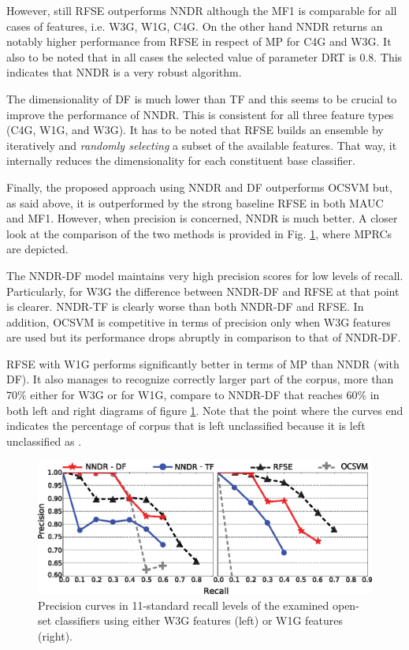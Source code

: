However, still RFSE outperforms NNDR although the MF1 is comparable for all cases of features, i.e. W3G, W1G, C4G. On the other hand NNDR returns an notably higher performance from RFSE in respect of MP for C4G and W3G. It also to be noted that in all cases the selected value of parameter DRT is 0.8. This indicates that NNDR is a very robust algorithm.

The dimensionality of DF is much lower than TF and this seems to be crucial to improve the performance of NNDR. This is consistent for all three feature types (C4G, W1G, and W3G). It has to be noted that RFSE builds an ensemble by iteratively and \textit{randomly selecting} a subset of the available features. That way, it internally reduces the dimensionality for each constituent base classifier. 

Finally, the proposed approach using NNDR and DF outperforms OCSVM but, as said above, it is outperformed by the strong baseline RFSE in both MAUC and MF1. However, when precision is concerned, NNDR is much better. A closer look at  the comparison of the two methods is provided in Fig. \ref{chap:word_embeddings:fig:NNDR_W3G_Best_RFSE_Baseline}, where MPRCs are depicted. 

The NNDR-DF model maintains very high precision scores for low levels of recall. Particularly, for W3G the difference between NNDR-DF and RFSE at that point is clearer. NNDR-TF is clearly worse than both NNDR-DF and RFSE. In addition, OCSVM is competitive in terms of precision only when W3G features are used but its performance drops abruptly in comparison to that of NNDR-DF. 

RFSE with W1G performs significantly better in terms of MP than NNDR (with DF). It also manages to recognize correctly larger part of the corpus, more than $70\%$ either for W3G or for W1G, compare to NNDR-DF that reaches $60\%$ in both left and right diagrams of figure \ref{chap:word_embeddings:fig:NNDR_W3G_Best_RFSE_Baseline}. Note that the point where the curves end indicates the percentage of corpus that is left unclassified because it is left unclassified as .


\begin{figure}[t]
\begin{center}
    \includegraphics[scale=0.95]{Figures/NNDR_W3G-W1G_Best_RFSE-OCSVM-Baselines.eps}
	\caption{Precision curves in 11-standard recall levels of the examined open-set classifiers using either W3G features (left) or W1G features (right).}
	\label{chap:word_embeddings:fig:NNDR_W3G_Best_RFSE_Baseline}
	\end{center}
\end{figure}

